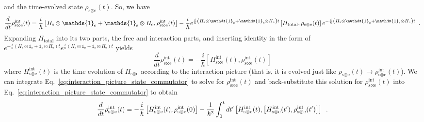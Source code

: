 \documentclass{article}
\begin{document}
and the time-evolved state $ \rho_{\textrm{s}\otimes \textrm{e}}(t) $. So, we
have
\begin{equation}
   \frac{d}{dt} \rho^{\textrm{int}}_{\textrm{s} \otimes \textrm{e}}(t)
   = \frac{i}{\hbar} \left[   H_{\textrm{s}} \otimes \mathds{1}_{\textrm{e}} +
      \mathds{1}_{\textrm{s}} \otimes H_{\textrm{e}},
   \rho^{\textrm{int}}_{\textrm{s} \otimes \textrm{e}}(t) \right]
      -
      \frac{i}{\hbar} e^{\frac{i}{\hbar} \left( H_{\textrm{s}} \otimes \mathds{1}_{\textrm{e}} +
      \mathds{1}_{\textrm{s}} \otimes H_{\textrm{e}}\right) t }
      \left[ H_{\textrm{total}}, \rho_{\textrm{s}\otimes \textrm{e}}(t) \right]
      e^{-\frac{i}{\hbar} \left( H_{\textrm{s}} \otimes \mathds{1}_{\textrm{e}} +
      \mathds{1}_{\textrm{s}} \otimes H_{\textrm{e}}\right) t } \enskip.
\end{equation}
Expanding $ H_{\textrm{total}} $ into its two parts, the free and interaction
parts, and inserting identity in the form of $ e^{-\frac{i}{\hbar} \left(
   H_{\textrm{s}} \otimes \mathds{1}_{\textrm{e}} + \mathds{1}_{\textrm{s}}
   \otimes H_{\textrm{e}}\right) t } e^{\frac{i}{\hbar} \left( H_{\textrm{s}}
   \otimes \mathds{1}_{\textrm{e}} + \mathds{1}_{\textrm{s}} \otimes
H_{\textrm{e}}\right) t } $ yields
\begin{equation}
   \frac{d}{dt} \rho_{\textrm{s} \otimes \textrm{e}}^{\textrm{int}}(t) =
   - \frac{i}{\hbar} \left[ H^{\textrm{int}}_{\textrm{s} \otimes \textrm{e}}(t),
   \rho_{\textrm{s} \otimes \textrm{e}}^{\textrm{int}}(t) \right]
   \label{eq:interaction_picture_state_commutator}
\end{equation}
where $ H^{\textrm{int}}_{\textrm{s} \otimes \textrm{e}}(t) $ is the time evolution of $
H_{\textrm{s} \otimes \textrm{e}} $ according to the interaction picture (that is, it is
evolved just like $ \rho_{\textrm{s} \otimes \textrm{e}}(t) \rightarrow
\rho^{\textrm{int}}_{\textrm{s} \otimes \textrm{e}}(t) $). We can integrate
Eq.~\ref{eq:interaction_picture_state_commutator} to solve for $
\rho_{\textrm{s} \otimes \textrm{e}}^{\textrm{int}}(t) $ and back-substitute this solution for $
\rho_{\textrm{s} \otimes \textrm{e}}^{\textrm{int}}(t) $ into Eq.~\ref{eq:interaction_picture_state_commutator}
to obtain
\begin{equation}
   \frac{d}{dt} \rho_{\textrm{s} \otimes \textrm{e}}^{\textrm{int}}(t) =
   -\frac{i}{\hbar} \left[ H_{\textrm{s} \otimes \textrm{e}}^{\textrm{int}}(t),
   \rho_{\textrm{s} \otimes \textrm{e}}^{\textrm{int}}(0) \right] -
   \frac{1}{\hbar^{2}}
   \int_{0}^{t} dt' \left[ H_{\textrm{s} \otimes \textrm{e}}^{\textrm{int}}(t),
      \left[ H_{\textrm{s} \otimes \textrm{e}}^{\textrm{int}}(t'),
   \rho_{\textrm{s} \otimes \textrm{e}}^{\textrm{int}}(t') \right] \right] \enskip.
   \label{eq:interaction_picture_integrodifferential_form_intermediate}
\end{equation}
\end{document}
